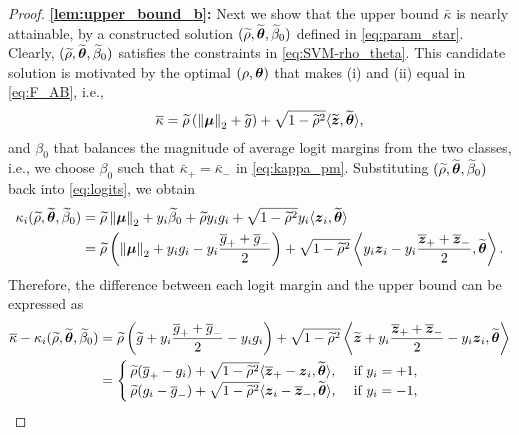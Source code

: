 \begin{proof}
\vspace{0.5\baselineskip}
\noindent
\textbf{\ref{lem:upper_bound_b}:}
Next we show that the upper bound $\bar\kappa$ is nearly attainable, by a constructed solution $(\widetilde\rho, \widetilde{{\boldsymbol{\theta}}}, \widetilde\beta_0)$ defined in \cref{eq:param_star}. Clearly, $(\widetilde\rho, \widetilde{{\boldsymbol{\theta}}}, \widetilde\beta_0)$ satisfies the constraints in \cref{eq:SVM-rho_theta}. This candidate solution is motivated by the optimal $(\rho, {\boldsymbol{\theta}})$ that makes (i) and (ii) equal in \cref{eq:F_AB}, i.e.,
\begin{equation*}
    \overline\kappa = \widetilde\rho \left(\left\|{{\boldsymbol{\mu}}}\right\|_2 +  \widetilde g \right) + \sqrt{1 - \widetilde\rho^2} \langle \widetilde{\text{\boldmath $z$}}, \widetilde{{\boldsymbol{\theta}}} \rangle, 
\end{equation*}
and $\beta_0$ that balances the magnitude of average logit margins from the two classes, i.e., we choose $\beta_0$ such that $\bar\kappa_+ = \bar\kappa_-$ in \cref{eq:kappa_pm}. Substituting $(\widetilde\rho, \widetilde{{\boldsymbol{\theta}}}, \widetilde\beta_0)$ back into \cref{eq:logits}, we obtain
\begin{equation*}
        \begin{aligned}
        \kappa_i(\widetilde\rho, \widetilde{{\boldsymbol{\theta}}}, \widetilde\beta_0) & = \widetilde\rho \left\|{{\boldsymbol{\mu}}}\right\|_2 + y_i\widetilde\beta_0 + \widetilde\rho y_i g_i + \sqrt{1 - \widetilde\rho^2} y_i \langle \text{\boldmath $z$}_i, \widetilde{{\boldsymbol{\theta}}} \rangle \\
        & = 
        \widetilde\rho \left( \left\|{{\boldsymbol{\mu}}}\right\|_2 + y_i g_i - y_i\frac{\overline g_{+} + \overline g_{-}}{2} \right) + \sqrt{1 - \widetilde\rho^2} \left\langle y_i \text{\boldmath $z$}_i - y_i \frac{\overline{\text{\boldmath $z$}}_{+} + \overline{\text{\boldmath $z$}}_{-}}{2}, \widetilde{{\boldsymbol{\theta}}} \right\rangle.
    \end{aligned}
\end{equation*}
Therefore, the difference between each logit margin and the upper bound can be expressed as
\begin{align}
        \overline\kappa - \kappa_i(\widetilde\rho, \widetilde{{\boldsymbol{\theta}}}, \widetilde\beta_0)
        & = \widetilde\rho \left( \widetilde g + y_i\frac{\overline g_{+} + \overline g_{-}}{2} - y_i g_i \right) + \sqrt{1 - \widetilde\rho^2} \left\langle \widetilde{\text{\boldmath $z$}} + y_i \frac{\overline{\text{\boldmath $z$}}_{+} + \overline{\text{\boldmath $z$}}_{-}}{2} - y_i \text{\boldmath $z$}_i , \widetilde{{\boldsymbol{\theta}}} \right\rangle  \nonumber  \\
        & = 
        \begin{cases} 
            \,  \widetilde\rho (\overline g_+ - g_i) +  \sqrt{1 - \widetilde\rho^2} \langle \overline{\text{\boldmath $z$}}_+ - \text{\boldmath $z$}_i, \widetilde{{\boldsymbol{\theta}}} \rangle , & \ \text{if} \ y_i = +1, \\
            \,  \widetilde\rho (g_i - \overline g_-) +  \sqrt{1 - \widetilde\rho^2} \langle \text{\boldmath $z$}_i - \overline{\text{\boldmath $z$}}_-, \widetilde{{\boldsymbol{\theta}}} \rangle , & \ \text{if} \ y_i = -1, \end{cases}        \label{eq:logit_diff}
\end{align}

\end{proof}

